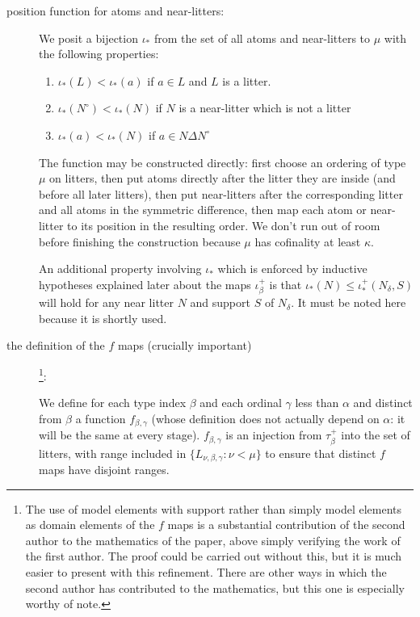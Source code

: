 \documentclass[112pt]{article}
\begin{document}
\begin{description}
\item[position function for atoms and near-litters:]  We posit a bijection $\iota_*$ from the set of all atoms and near-litters to $\mu$ with the following properties:

\begin{enumerate}

\item $\iota_*(L) < \iota_*(a)$ if $a \in L$ and $L$ is a litter.

\item  $\iota_*(N^\circ)<\iota_*(N)$ if $N$ is a near-litter which is not a litter

\item $\iota_*(a) < \iota_*(N)$ if $a \in N \Delta N^\circ$

\end{enumerate}

The function may be constructed directly: first choose an ordering of type $\mu$ on litters, then put atoms directly after the litter they are inside (and before all later litters), then put near-litters after the corresponding litter and all atoms in the symmetric difference, then map each atom or near-litter to its position in the resulting order.
We don't run out of room before finishing the construction because \( \mu \) has cofinality at least \( \kappa \).

An additional property involving $\iota_*$ which is enforced by inductive hypotheses explained later about the maps $\iota_\beta^+$ is that $\iota_*(N) \leq \iota_*^+(N_\delta,S)$ will hold for any near litter $N$ and support $S$ of $N_\delta$.  It must be noted here because it is shortly used.


\item [the definition of the $f$ maps (crucially important)] \footnote{The use of model elements with support rather than simply model elements as domain elements of the $f$ maps is a substantial contribution of the second author to the mathematics of the paper, above simply verifying the work of the first author.  The proof could be carried out without this, but it is much easier to present with this refinement.  There are other ways in which the second author has contributed to the mathematics, but this one is especially worthy of note.}:

We define for each type index $\beta$ and each ordinal $\gamma$ less than $\alpha$ and distinct from $\beta$ a function $f_{\beta,\gamma}$ (whose definition does not actually depend on $\alpha$:  it will be the same at every stage).  $f_{\beta,\gamma}$ is an injection from $\tau_\beta^+$ into the set of litters, with range included in \newline $\{L_{\nu,\beta,\gamma}:\nu < \mu\}$ to ensure that distinct $f$ maps have disjoint ranges.



\end{description}
\end{document}
